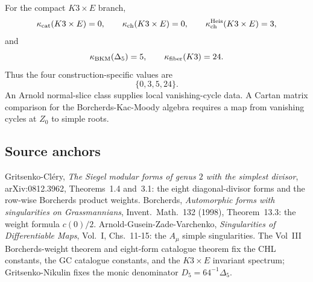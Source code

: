 For the compact \(K3\times E\) branch,
\[
  \kappa_{\mathrm{cat}}(K3\times E)=0,\qquad
  \kappa_{\mathrm{ch}}(K3\times E)=0,\qquad
  \kappa_{\mathrm{ch}}^{\mathrm{Heis}}(K3\times E)=3,
\]
and
\[
  \kappa_{\mathrm{BKM}}(\Delta_5)=5,\qquad
  \kappa_{\mathrm{fiber}}(K3)=24.
\]
Thus the four construction-specific values are
\[
  \{0,3,5,24\}.
\]
An Arnold normal-slice class supplies local vanishing-cycle data.  A
Cartan matrix comparison for the Borcherds-Kac-Moody algebra requires a
map from vanishing cycles at \(Z_0\) to simple roots.

\subsection*{Source anchors}

Gritsenko-Cl\'ery, \emph{The Siegel modular forms of genus \(2\) with
the simplest divisor}, arXiv:0812.3962, Theorems~1.4 and~3.1: the
eight diagonal-divisor forms and the row-wise Borcherds product
weights.  Borcherds, \emph{Automorphic forms with singularities on
Grassmannians}, Invent.\ Math.\ 132 (1998), Theorem~13.3: the weight
formula \(c(0)/2\).  Arnold-Gusein-Zade-Varchenko,
\emph{Singularities of Differentiable Maps}, Vol.~I, Chs.~11-15:
the \(A_\mu\) simple singularities.  The Vol~III Borcherds-weight
theorem and eight-form catalogue theorem fix the CHL constants, the GC
catalogue constants, and the \(K3\times E\) invariant spectrum;
Gritsenko-Nikulin fixes the monic denominator
\(D_5=64^{-1}\Delta_5\).
